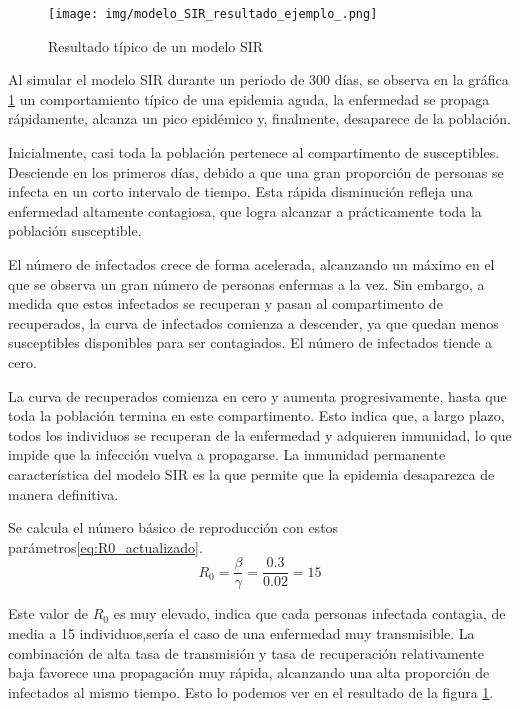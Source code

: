 \begin{figure}[H]
    \centering
    \texttt{[image: img/modelo\_SIR\_resultado\_ejemplo\_.png]}
    \caption{Resultado típico de un modelo SIR}
    \label{fig:ejemplo SIR}
    \vspace{0.5cm} %
\end{figure}


Al simular el modelo SIR durante un periodo de 300 días, se observa en la gráfica \ref{fig:ejemplo SIR} un comportamiento típico de una epidemia aguda, la enfermedad se propaga rápidamente, alcanza un pico epidémico y, finalmente, desaparece de la población.

Inicialmente, casi toda la población pertenece al compartimento de susceptibles. Desciende en los primeros días, debido a que una gran proporción de personas se infecta en un corto intervalo de tiempo. Esta rápida disminución refleja una enfermedad altamente contagiosa, que logra alcanzar a prácticamente toda la población susceptible.

El número de infectados crece de forma acelerada, alcanzando un máximo en el que se observa un gran número de personas enfermas a la vez. Sin embargo, a medida que estos infectados se recuperan y pasan al compartimento de recuperados, la curva de infectados comienza a descender, ya que quedan menos susceptibles disponibles para ser contagiados. El número de infectados tiende a cero.

La curva de recuperados comienza en cero y aumenta progresivamente, hasta que toda la población termina en este compartimento. Esto indica que, a largo plazo, todos los individuos se recuperan de la enfermedad y adquieren inmunidad, lo que impide que la infección vuelva a propagarse. La inmunidad permanente característica del modelo SIR es la que permite que la epidemia desaparezca de manera definitiva.

Se calcula el número básico de reproducción con estos parámetros\eqref{eq:R0_actualizado}.
\begin{equation}
R_0 = \frac{\beta}{\gamma} = \frac{0.3}{0.02} = 15
\label{eq:R0_actualizado}
\end{equation}

Este valor de $R_0$ es muy elevado, indica que cada personas infectada contagia, de media a 15 individuos,sería el caso de una enfermedad muy transmisible. La combinación de alta tasa de transmisión y tasa de recuperación relativamente baja favorece una propagación muy rápida, alcanzando una alta proporción de infectados al mismo tiempo. Esto lo podemos ver en el resultado de la figura \ref{fig:ejemplo SIR}.

